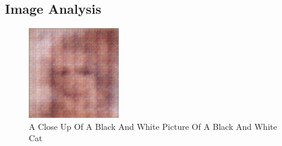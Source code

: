 \documentclass{article}%
\begin{document}
%
\subsection{Image Analysis}%
\label{subsec:ImageAnalysis}%


\begin{figure}[h!]%
\centering%
\includegraphics[width=150px]{500_fake_images/samples_5_466.png}%
\caption{A Close Up Of A Black And White Picture Of A Black And White Cat}%
\end{figure}

%
\end{document}
